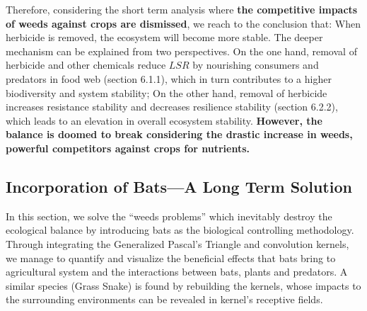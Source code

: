 \documentclass[12pt]{article}
\begin{document}
Therefore, considering the short term analysis where \textbf{the competitive impacts of weeds against crops are dismissed}, we reach to the conclusion that: When herbicide is removed, the ecosystem will become more stable. The deeper mechanism can be explained from two perspectives. On the one hand, removal of herbicide and other chemicals reduce $LSR$ by nourishing consumers and predators in food web (section 6.1.1), which in turn contributes to a higher biodiversity and system stability; On the other hand, removal of herbicide increases resistance stability and decreases resilience stability (section 6.2.2), which leads to an elevation in overall ecosystem stability. \textbf{However, the balance is doomed to break considering the drastic increase in weeds, powerful competitors against crops for nutrients.}

\subsection{Incorporation of Bats---A Long Term Solution}
\hspace{1.5em}In this section, we solve the ``weeds problems'' which inevitably destroy the ecological balance by introducing bats as the biological controlling methodology. Through integrating the Generalized Pascal's Triangle and convolution kernels, we manage to quantify and visualize the beneficial effects that bats bring to agricultural system and the interactions between bats, plants and predators. A similar species (Grass Snake) is found by rebuilding the kernels, whose impacts to the surrounding environments can be revealed in kernel's receptive fields.
\end{document}
